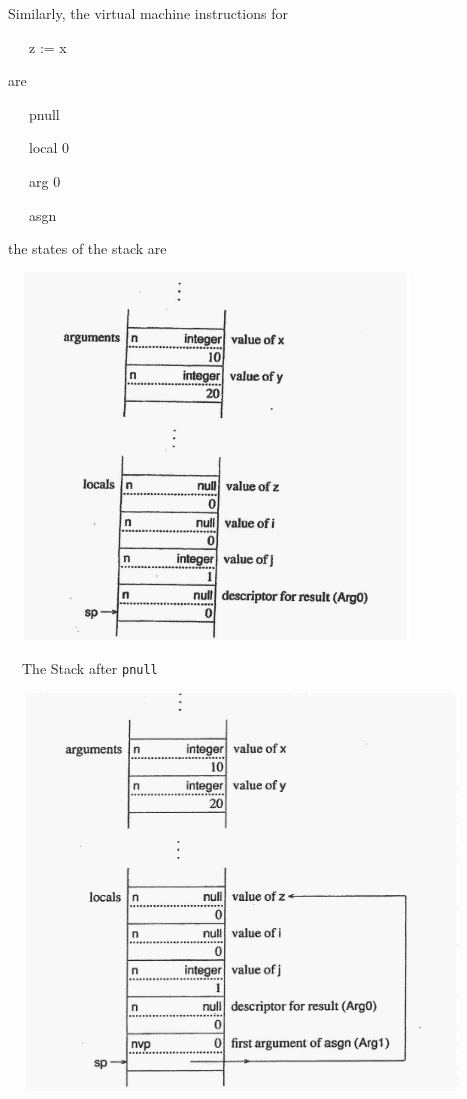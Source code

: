 Similarly, the virtual machine instructions for

{\ttfamily\mdseries
\ \ \ z := x}

are

\ \ \ pnull

\ \ \ local 0

\ \ \ arg 0

\ \ \ asgn

\noindent the states of the stack are


\ \  \includegraphics[width=4.0602in,height=3.8307in]{ib-img/ib-img051.jpg} 


\ \ The Stack after \texttt{pnull}


\ \  \includegraphics[width=4.5953in,height=4.1516in]{ib-img/ib-img052.jpg} 


